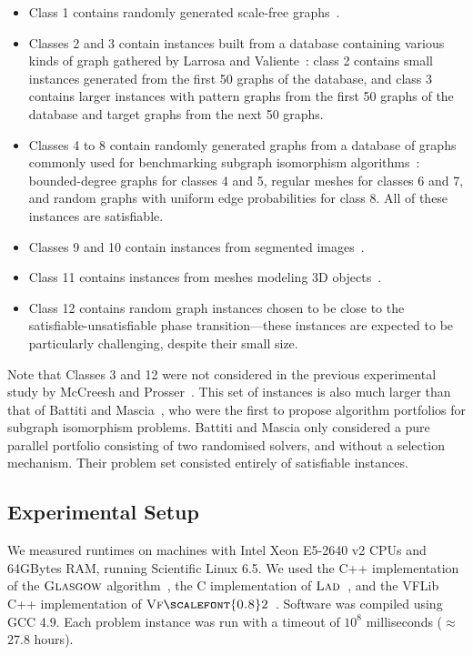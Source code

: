 \documentclass{llncs}
\newcommand{\VFtwo}{$\textsc{Vf{\scalefont{0.8}2}}$\xspace}
\newcommand{\Glasgow}{$\textsc{Glasgow}$\xspace}
\newcommand{\LAD}{$\textsc{Lad}$\xspace}
\begin{document}
\begin{itemize}
\item Class 1 contains randomly generated scale-free graphs~\cite{constraints10}.
\item Classes 2 and 3 contain instances built from a database containing
    various kinds of graph gathered by Larrosa and Valiente~\cite{LV02}: class
    2 contains small instances generated from the first 50 graphs of the
    database, and class 3 contains larger instances with pattern graphs from
    the first 50 graphs of the database and target graphs from the next 50
    graphs.
\item Classes 4 to 8 contain randomly generated graphs from a database of
    graphs commonly used for benchmarking subgraph isomorphism
    algorithms~\cite{GraphDatabase1}: bounded-degree graphs for
    classes 4 and 5, regular meshes for classes 6 and 7, and random graphs with
    uniform edge probabilities for class 8. All of these instances are
    satisfiable.
\item Classes 9 and 10 contain instances from segmented images~\cite{pr15,cviu11}.
\item Class 11 contains instances from meshes modeling 3D objects~\cite{cviu11}.
\item Class 12 contains random graph instances chosen to be close to the satisfiable-unsatisfiable
    phase transition---these instances are expected to be particularly challenging, despite their
    small size.
\end{itemize}

\noindent Note that Classes 3 and 12 were not considered in the previous
experimental study by McCreesh and Prosser~\cite{McCreesh:2015}.  This set of
instances is also much larger than that of Battiti and
Mascia~\cite{battiti-mascia07}, who were the first to propose algorithm
portfolios for subgraph isomorphism problems.  Battiti and Mascia only
considered a pure parallel portfolio consisting of two randomised solvers, and
without a selection mechanism. Their problem set consisted entirely of
satisfiable instances.

\subsection{Experimental Setup}

We measured runtimes on machines with Intel Xeon E5-2640 v2 CPUs and 64GBytes RAM, running
Scientific Linux 6.5. We used the C++ implementation of the \Glasgow algorithm~\cite{McCreesh:2015},
the C implementation of \LAD{}~\cite{Solnon:2010}, and the VFLib C++
implementation of \VFtwo{}~\cite{Cordella:2004}. Software was compiled using GCC 4.9. Each problem instance was run with a
timeout of $10^8$ milliseconds ($\approx$ 27.8 hours).
\end{document}
